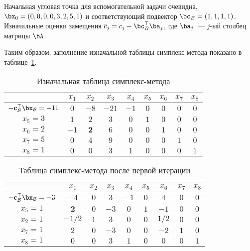 \documentclass[12pt]{article}
\begin{document}
Начальная угловая точка для вспомогательной задачи очевидна, $\bx_0 = (0,0,0,0, 3, 2, 5, 1)$ и соответствующий подвектор $\bc_{B} = (1,1,1,1)$.
Изначальные оценки замещения $\overline{c}_j = c_j - \bc^{\top}_B \ba_j$, где $\ba_j$~--- $j$-ый столбец матрицы $\bA$.

Таким образом, заполнение изначальной таблицы симплекс-метода показано в таблице~\ref{tab::simplex_30}.

\begin{table}[!ht]
\centering
\caption{Изначальная таблица симплекс-метода}
\begin{tabular}{|c|cccccccc|}
\hline
& $x_1$ & $x_2$ & $x_3$ & $x_4$ & $x_5$ & $x_6$ & $x_7$ & $x_8$\\
\hline
$-\mathbf{c}_{\mathcal{B}}^{\top}\bx_{\mathcal{B}} = -11$ & $0$ & $-8$ & $-21$ & $-1$ & $0$ & $0$ & $0$ & $0$ \\
\hline
$x_5 = 3$ & $1$ & $2$ & $3$ & $0$ & $1$ & $0$ & $0$ & $0$ \\
$x_6 = 2$ & $-1$ & $\mathbf{2}$ & $6$ & $0$ & $0$ & $1$ & $0$ & $0$ \\
$x_7 = 5$ & $0$ & $4$ & $9$ & $0$ & $0$ & $0$ & $1$ & $0$ \\
$x_8 = 1$ & $0$ & $0$ & $3$ & $1$ & $0$ & $0$ & $0$ & $1$\\
\hline
\end{tabular}
\label{tab::simplex_30}
\end{table}

\begin{table}[!ht]
\centering
\caption{Таблица симплекс-метода после первой итерации}
\begin{tabular}{|c|cccccccc|}
\hline
& $x_1$ & $x_2$ & $x_3$ & $x_4$ & $x_5$ & $x_6$ & $x_7$ & $x_8$\\
\hline
$-\mathbf{c}_{\mathcal{B}}^{\top}\bx_{\mathcal{B}} = -3$ & $-4$ & $0$ & $3$ & $-1$ & $0$ & $4$ & $0$ & $0$ \\
\hline
$x_5 = 1$ & $\mathbf{2}$ & $0$ & $-3$ & $0$ & $1$ & $-1$ & $0$ & $0$ \\
$x_2 = 1$ & $-1/2$ & $1$ & $3$ & $0$ & $0$ & $1/2$ & $0$ & $0$ \\
$x_7 = 1$ & $2$ & $0$ & $-3$ & $0$ & $0$ & $-2$ & $1$ & $0$ \\
$x_8 = 1$ & $0$ & $0$ & $3$ & $1$ & $0$ & $0$ & $0$ & $1$\\
\hline
\end{tabular}
\label{tab::simplex_31}
\end{table}
\end{document}

